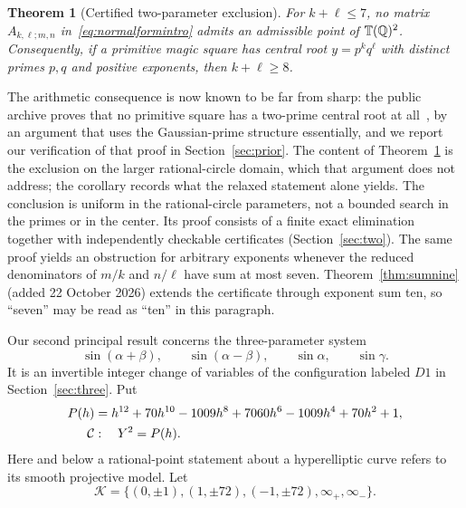 \documentclass[11pt,letterpaper]{article}
\newtheorem{theorem}{Theorem}[section]
\theoremstyle{definition}\newtheorem{definition}[theorem]{Definition}
\theoremstyle{remark}\newtheorem{remark}[theorem]{Remark}
\newcommand{\Q}{\mathbb Q}\newcommand{\Z}{\mathbb Z}\newcommand{\R}{\mathbb R}
\begin{document}
\begin{theorem}[Certified two-parameter exclusion]\label{thm:main-two}
For $k+\ell\le7$, no matrix $A_{k,\ell;m,n}$ in~\eqref{eq:normalformintro} admits an admissible point of $\T(\Q)^2$. Consequently, if a primitive magic square has central root $y=p^kq^\ell$ with distinct primes $p,q$ and positive exponents, then $k+\ell\ge8$.
\end{theorem}
The arithmetic consequence is now known to be far from sharp: the public archive proves that no primitive square has a two-prime central root at all~\cite{MSSTwoBlock}, by an argument that uses the Gaussian-prime structure essentially, and we report our verification of that proof in Section~\ref{sec:prior}. The content of Theorem~\ref{thm:main-two} is the exclusion on the larger rational-circle domain, which that argument does not address; the corollary records what the relaxed statement alone yields. The conclusion is uniform in the rational-circle parameters, not a bounded search in the primes or in the center. Its proof consists of a finite exact elimination together with independently checkable certificates (Section~\ref{sec:two}). The same proof yields an obstruction for arbitrary exponents whenever the reduced denominators of $m/k$ and $n/\ell$ have sum at most seven. Theorem~\ref{thm:sumnine} (added 22 October 2026) extends the certificate through exponent sum ten, so ``seven'' may be read as ``ten'' in this paragraph.

Our second principal result concerns the three-parameter system
\begin{equation}\label{eq:canonicalintro}
 \sin(\alpha+\beta),\qquad\sin(\alpha-\beta),\qquad
 \sin\alpha,\qquad\sin\gamma.
\end{equation}
It is an invertible integer change of variables of the configuration labeled $D1$ in Section~\ref{sec:three}. Put
\begin{align}
 P(h)&=h^{12}+70h^{10}-1009h^8+7060h^6
                  -1009h^4+70h^2+1,\label{eq:Pintro}\\
 \mathcal C&:\quad Y^2=P(h).\notag
\end{align}
Here and below a rational-point statement about a hyperelliptic curve refers to its smooth projective model. Let
\begin{equation}\label{eq:knownintro}
 \mathcal K=\{(0,\pm1),(1,\pm72),(-1,\pm72),\infty_+,\infty_-\}.
\end{equation}
\end{document}
